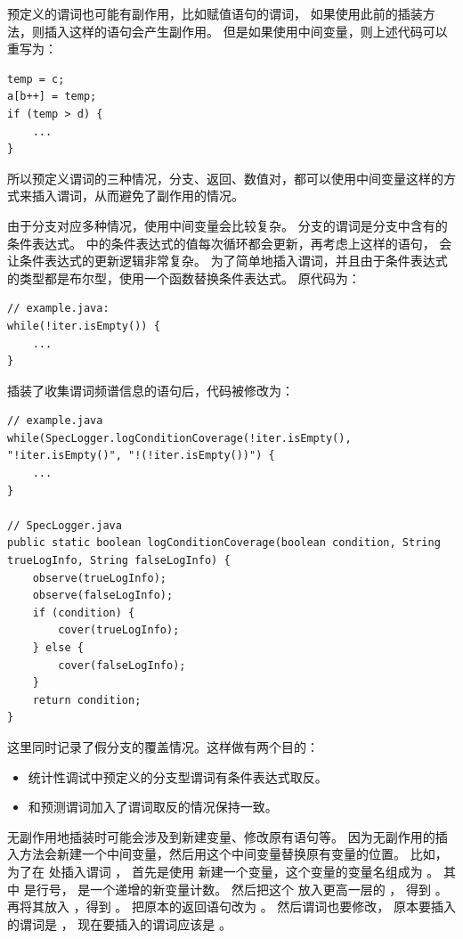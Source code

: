 预定义的谓词也可能有副作用，比如赋值语句的谓词，
如果使用此前的插装方法，则插入这样的语句会产生副作用。
但是如果使用中间变量，则上述代码可以重写为：
\lstset{language=Java}
\begin{lstlisting}
temp = c;
a[b++] = temp;
if (temp > d) {
    ...
}
\end{lstlisting}
所以预定义谓词的三种情况，分支、返回、数值对，都可以使用中间变量这样的方式来插入谓词，从而避免了副作用的情况。

由于分支对应多种情况，使用中间变量会比较复杂。
分支的谓词是分支中含有的条件表达式。
中的条件表达式的值每次循环都会更新，再考虑上这样的语句，
会让条件表达式的更新逻辑非常复杂。
为了简单地插入谓词，并且由于条件表达式的类型都是布尔型，使用一个函数替换条件表达式。
原代码为：
\lstset{language=Java}
\begin{lstlisting}
// example.java:
while(!iter.isEmpty()) {
	...
}
\end{lstlisting}
插装了收集谓词频谱信息的语句后，代码被修改为：
\lstset{language=Java}
\begin{lstlisting}
// example.java
while(SpecLogger.logConditionCoverage(!iter.isEmpty(), "!iter.isEmpty()", "!(!iter.isEmpty())") {
	...
}

// SpecLogger.java
public static boolean logConditionCoverage(boolean condition, String trueLogInfo, String falseLogInfo) {
	observe(trueLogInfo);
	observe(falseLogInfo);
	if (condition) {
		cover(trueLogInfo);
	} else {
		cover(falseLogInfo);
	}
	return condition;
}
\end{lstlisting}
这里同时记录了假分支的覆盖情况。这样做有两个目的：
\begin{itemize}
\item 统计性调试中预定义的分支型谓词有条件表达式取反。
\item 和预测谓词加入了谓词取反的情况保持一致。
\end{itemize}

无副作用地插装时可能会涉及到新建变量、修改原有语句等。
因为无副作用的插入方法会新建一个中间变量，然后用这个中间变量替换原有变量的位置。
比如，为了在  处插入谓词 ，
首先是使用  新建一个变量，这个变量的变量名组成为
。
其中  是行号，  是一个递增的新变量计数。
然后把这个  放入更高一层的  ，
得到 。
再将其放入 ，得到 。
把原本的返回语句改为 。
然后谓词也要修改，
原本要插入的谓词是 ，
现在要插入的谓词应该是 。

